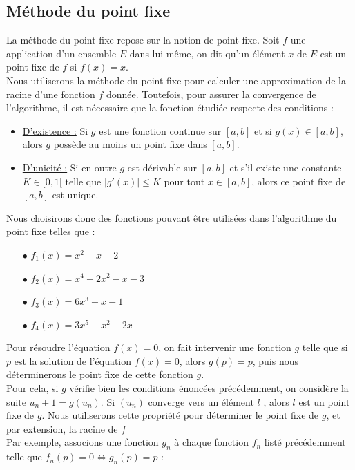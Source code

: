 \documentclass[12pt]{article}
\begin{document}
\subsection{Méthode du point fixe}
\label{ref:pt-fixe}
\noindent La méthode du point fixe repose sur la notion de point fixe. Soit $f$ une application d'un ensemble $E$ dans lui-même, on dit qu'un élément $x$ de $E$ est un point fixe de $f$ si $f(x) = x$.\\
Nous utiliserons la méthode du point fixe pour calculer une approximation de la racine d'une fonction $f$ donnée. Toutefois, pour assurer la convergence de l'algorithme, il est nécessaire que la fonction étudiée respecte des conditions :
\begin{itemize}
    \item \underline{D'existence :} Si $g$ est une fonction continue sur $[a,b]$ et si $g(x)\in[a,b]$, alors $g$ possède au moins un point fixe dans $[a,b]$.
    \item \underline{D'unicité :} Si en outre $g$ est dérivable sur $[a,b]$ et s'il existe une constante $K\in[0,1[$ telle que $|g'(x)|\leq K$ pour tout $x\in[a,b]$, alors ce point fixe de $[a,b]$ est unique.
\end{itemize}
Nous choisirons donc des fonctions pouvant être utilisées dans l'algorithme du point fixe telles que :
\begin{multicols}{2}
\begin{itemize}
    \item[$\bullet$] $f_1(x)=x^2-x-2$
    \item[$\bullet$] $f_2(x)=x^4+2x^2-x-3$
    \item[$\bullet$] $f_3(x)=6x^3-x- 1$
    \item[$\bullet$] $f_4(x)=3x^5+x^2-2x$
\end{itemize}
\end{multicols}
\noindent Pour résoudre l'équation $f(x)=0$, on fait intervenir une fonction $g$ telle que si $p$ est la solution de l'équation $f(x)=0$, alors $g(p) = p$, puis nous déterminerons le point fixe de cette fonction $g$.\\
Pour cela, si $g$ vérifie bien les conditions énoncées précédemment, on considère la suite $u_n+1=g(u_n)$. Si $(u_n)$ converge vers un élément $l$ , alors $l$ est un point fixe de $g$. Nous utiliserons cette propriété pour déterminer le point fixe de $g$, et par extension, la racine de $f$\\
Par exemple, associons une fonction $g_n$ à chaque fonction $f_n$ listé précédemment telle que $f_n(p)=0 \iff g_n(p)=p$ :
\end{document}
